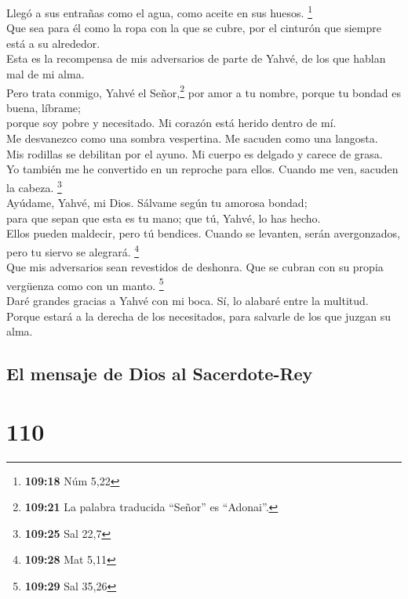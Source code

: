 Llegó a sus entrañas como el agua, como aceite en sus huesos.
\footnote{\textbf{109:18} Núm 5,22}\\
 Que sea para él como la ropa con la que se cubre, por el
cinturón que siempre está a su alrededor.\\
 Esta es la recompensa de mis adversarios de parte de
Yahvé, de los que hablan mal de mi alma.\\
 Pero trata conmigo, Yahvé el Señor,\footnote{\textbf{109:21}
  La palabra traducida ``Señor'' es ``Adonai''.} por amor a tu nombre,
porque tu bondad es buena, líbrame;\\
 porque soy pobre y necesitado. Mi corazón está herido
dentro de mí.\\
 Me desvanezco como una sombra vespertina. Me sacuden
como una langosta.\\
 Mis rodillas se debilitan por el ayuno. Mi cuerpo es
delgado y carece de grasa.\\
 Yo también me he convertido en un reproche para ellos.
Cuando me ven, sacuden la cabeza. \footnote{\textbf{109:25} Sal 22,7}\\
 Ayúdame, Yahvé, mi Dios. Sálvame según tu amorosa
bondad;\\
 para que sepan que esta es tu mano; que tú, Yahvé, lo
has hecho.\\
 Ellos pueden maldecir, pero tú bendices. Cuando se
levanten, serán avergonzados, pero tu siervo se alegrará. \footnote{\textbf{109:28}
  Mat 5,11}\\
 Que mis adversarios sean revestidos de deshonra. Que se
cubran con su propia vergüenza como con un manto. \footnote{\textbf{109:29}
  Sal 35,26}\\
 Daré grandes gracias a Yahvé con mi boca. Sí, lo alabaré
entre la multitud.\\
 Porque estará a la derecha de los necesitados, para
salvarle de los que juzgan su alma.

\hypertarget{el-mensaje-de-dios-al-sacerdote-rey}{%
\subsection{El mensaje de Dios al
Sacerdote-Rey}\label{el-mensaje-de-dios-al-sacerdote-rey}}

\hypertarget{section-107}{%
\section{110}\label{section-107}}

